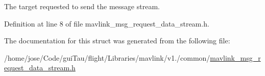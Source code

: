 The target requested to send the message stream. 



Definition at line 8 of file mavlink\-\_\-msg\-\_\-request\-\_\-data\-\_\-stream.\-h.



The documentation for this struct was generated from the following file\-:\begin{DoxyCompactItemize}
\item 
/home/jose/\-Code/gui\-Tau/flight/\-Libraries/mavlink/v1./common/\hyperlink{mavlink__msg__request__data__stream_8h}{mavlink\-\_\-msg\-\_\-request\-\_\-data\-\_\-stream.\-h}\end{DoxyCompactItemize}
